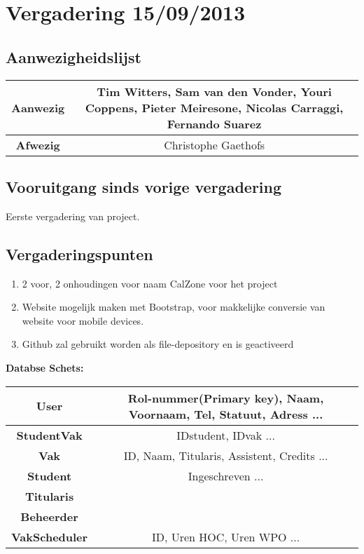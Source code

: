 \section{Vergadering 15/09/2013}
\subsection{Aanwezigheidslijst}
\begin{table}[htbp]
	\centering
	\begin{tabular}{c|c}
		\textbf{Aanwezig} & Tim Witters, Sam van den Vonder, Youri Coppens, Pieter Meiresone,  Nicolas Carraggi,  Fernando Suarez \\
		\hline
		\textbf{Afwezig} & Christophe Gaethofs \\
	\end{tabular}
\end{table}

\subsection{Vooruitgang sinds vorige vergadering}
Eerste vergadering van project.\\

\subsection{Vergaderingspunten}
\begin{enumerate}
	\item 2 voor, 2 onhoudingen voor naam CalZone voor het project \\
	\item Website mogelijk maken met Bootstrap, voor makkelijke conversie van website voor mobile devices. \\
	\item Github zal gebruikt worden als file-depository en is geactiveerd \\
\end{enumerate}

\noindent\textbf{Databse Schets:}

\begin{table}[htbp]
	\centering
	\begin{tabular}{c|c}
	\textbf{User} & Rol-nummer(Primary key), Naam, Voornaam, Tel, Statuut, Adress ... \\
	\hline
	\textbf{StudentVak} & IDstudent, IDvak ...\\
	\hline
	\textbf{Vak} & ID, Naam, Titularis, Assistent, Credits ...\\
	\hline
	\textbf{Student} & Ingeschreven ...\\
	\hline
	\textbf{Titularis} & \\
	\hline
	\textbf{Beheerder} & \\
	\hline
	\textbf{VakScheduler} & ID, Uren HOC, Uren WPO ...\\
	\end{tabular}
\end{table}

